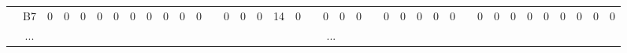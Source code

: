 \documentclass[12pt]{article}
\begin{document}
\begin{table}[!ht]
{\begin{tabular}{cccccccccccccccccccccccccccccccccccccc}
\multicolumn{1}{c|}{}                       & \multicolumn{1}{c|}{B7}  & \multicolumn{1}{c|}{0}  & \multicolumn{1}{c|}{0}  & \multicolumn{1}{c|}{0}  & \multicolumn{1}{c|}{0}  & \multicolumn{1}{c|}{0}  & \multicolumn{1}{c|}{0}  & \multicolumn{1}{c|}{0}  & \multicolumn{1}{c|}{0}  & \multicolumn{1}{c|}{0}  & \multicolumn{1}{c|}{0}  & \multicolumn{1}{c|}{}                     & \multicolumn{1}{c|}{0}  & \multicolumn{1}{c|}{0}  & \multicolumn{1}{c|}{0}  & \multicolumn{1}{c|}{14} & \multicolumn{1}{c|}{0}  & \multicolumn{1}{c|}{}                     & \multicolumn{1}{c|}{0}  & \multicolumn{1}{c|}{0}  & \multicolumn{1}{c|}{0}  & \multicolumn{1}{c|}{}                     & \multicolumn{1}{c|}{0}  & \multicolumn{1}{c|}{0}  & \multicolumn{1}{c|}{0}  & \multicolumn{1}{c|}{0}  & \multicolumn{1}{c|}{0}  & \multicolumn{1}{c|}{}                     & \multicolumn{1}{c|}{0}  & \multicolumn{1}{c|}{0}  & \multicolumn{1}{c|}{0}  & \multicolumn{1}{c|}{0}  & \multicolumn{1}{c|}{0}  & \multicolumn{1}{c|}{0}  & \multicolumn{1}{c|}{0}  & \multicolumn{1}{c|}{0}  & \multicolumn{1}{c|}{0}  \\ \cline{2-12} \cline{14-18} \cline{20-22} \cline{24-28} \cline{30-38} 
\multicolumn{1}{c|}{}                       & \multicolumn{1}{c|}{...} & \multicolumn{36}{c|}{...}                                                                                                                                                                                                                                                                                                                                                                                                                                                                                                                                                                                                                                                                                                                                                                                                                                                                                                                                                                                                                     \\ \cline{2-12} \cline{14-18} \cline{20-22} \cline{24-28} \cline{30-38} 

\end{tabular}}
\end{table}
\end{document}
